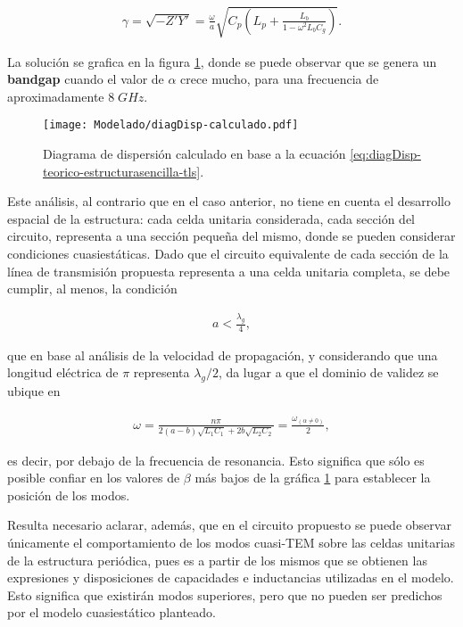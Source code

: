 \begin{align}
	\label{eq:diagDisp-teorico-estructurasencilla-tls}
	\gamma = \sqrt{-Z'Y'} = \frac{\omega}{a} \sqrt{C_p \left( L_p + \frac{L_b}{1-\omega^2 L_b C_g}\right)}.
\end{align}

La solución se grafica en la figura \ref{fig:diagDisp-calculado-celdafacil}, donde se puede observar que se genera un \textbf{bandgap} cuando el valor de $\alpha$ crece mucho, para una frecuencia de aproximadamente $8\;GHz$.

\begin{figure}[h]
	\centering
	\texttt{[image: Modelado/diagDisp-calculado.pdf]}
	\caption{Diagrama de dispersión calculado en base a la ecuación \ref{eq:diagDisp-teorico-estructurasencilla-tls}.}
	\label{fig:diagDisp-calculado-celdafacil}
\end{figure}

Este análisis, al contrario que en el caso anterior, no tiene en cuenta el desarrollo espacial de la estructura: cada celda unitaria considerada, cada sección del circuito, representa a una sección pequeña del mismo, donde se pueden considerar condiciones cuasiestáticas. Dado que el circuito equivalente de cada sección de la línea de transmisión propuesta representa a una celda unitaria completa, se debe cumplir, al menos, la condición \cite{Caloz:ElectromagneticMetamaterials}

\begin{align}
	a < \frac{\lambda_g}{4},
\end{align}

que en base al análisis de la velocidad de propagación, y considerando que una longitud eléctrica de $\pi$ representa $\lambda_g / 2$, da lugar a que el dominio de validez se ubique en

\begin{align}
	\omega = \frac{n\pi}{2 (a-b) \sqrt{L_1 C_1} + 2 b \sqrt{L_2 C_2}} = \frac{\omega_{(\alpha\neq 0)}}{2},
\end{align}

es decir, por debajo de la frecuencia de resonancia. Esto significa que sólo es posible confiar en los valores de $\beta$ más bajos de la gráfica \ref{fig:diagDisp-calculado-celdafacil} para establecer la posición de los modos.

Resulta necesario aclarar, además, que en el circuito propuesto se puede observar únicamente el comportamiento de los modos cuasi-TEM sobre las celdas unitarias de la estructura periódica, pues es a partir de los mismos que se obtienen las expresiones y disposiciones de capacidades e inductancias utilizadas en el modelo. Esto significa que existirán modos superiores, pero que no pueden ser predichos por el modelo cuasiestático planteado.





